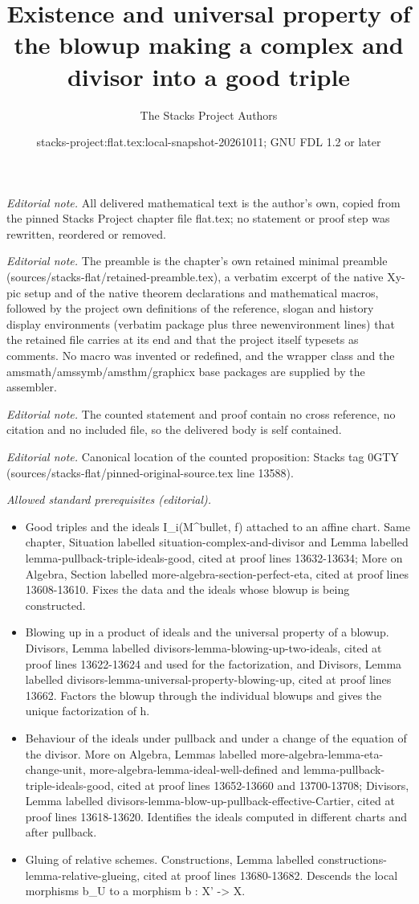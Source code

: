 \documentclass[10pt,a4paper]{amsart}
\title{Existence and universal property of the blowup making a complex and divisor into a good triple}
\author{The Stacks Project Authors}
\date{stacks-project:flat.tex:local-snapshot-20261011; GNU FDL 1.2 or later}
\theoremstyle{plain}
\theoremstyle{definition}
\theoremstyle{remark}
\numberwithin{equation}{subsection}
\begin{document}
\maketitle
\noindent\textit{Editorial note.} All delivered mathematical text is the author's own, copied from the pinned Stacks Project chapter file flat.tex; no statement or proof step was rewritten, reordered or removed.\par\medskip
\noindent\textit{Editorial note.} The preamble is the chapter's own retained minimal preamble (sources/stacks-flat/retained-preamble.tex), a verbatim excerpt of the native Xy-pic setup and of the native theorem declarations and mathematical macros, followed by the project own definitions of the reference, slogan and history display environments (verbatim package plus three newenvironment lines) that the retained file carries at its end and that the project itself typesets as comments. No macro was invented or redefined, and the wrapper class and the amsmath/amssymb/amsthm/graphicx base packages are supplied by the assembler.\par\medskip
\noindent\textit{Editorial note.} The counted statement and proof contain no cross reference, no citation and no included file, so the delivered body is self contained.\par\medskip
\noindent\textit{Editorial note.} Canonical location of the counted proposition: Stacks tag 0GTY (sources/stacks-flat/pinned-original-source.tex line 13588).\par\medskip
\noindent\textit{Allowed standard prerequisites (editorial).}\begin{itemize}
\item Good triples and the ideals I\_i(M\textasciicircum{}bullet, f) attached to an affine chart. Same chapter, Situation labelled situation-complex-and-divisor and Lemma labelled lemma-pullback-triple-ideals-good, cited at proof lines 13632-13634; More on Algebra, Section labelled more-algebra-section-perfect-eta, cited at proof lines 13608-13610. Fixes the data and the ideals whose blowup is being constructed.
\item Blowing up in a product of ideals and the universal property of a blowup. Divisors, Lemma labelled divisors-lemma-blowing-up-two-ideals, cited at proof lines 13622-13624 and used for the factorization, and Divisors, Lemma labelled divisors-lemma-universal-property-blowing-up, cited at proof lines 13662. Factors the blowup through the individual blowups and gives the unique factorization of h.
\item Behaviour of the ideals under pullback and under a change of the equation of the divisor. More on Algebra, Lemmas labelled more-algebra-lemma-eta-change-unit, more-algebra-lemma-ideal-well-defined and lemma-pullback-triple-ideals-good, cited at proof lines 13652-13660 and 13700-13708; Divisors, Lemma labelled divisors-lemma-blow-up-pullback-effective-Cartier, cited at proof lines 13618-13620. Identifies the ideals computed in different charts and after pullback.
\item Gluing of relative schemes. Constructions, Lemma labelled constructions-lemma-relative-glueing, cited at proof lines 13680-13682. Descends the local morphisms b\_U to a morphism b : X' -> X.
\end{itemize}\medskip
\end{document}

